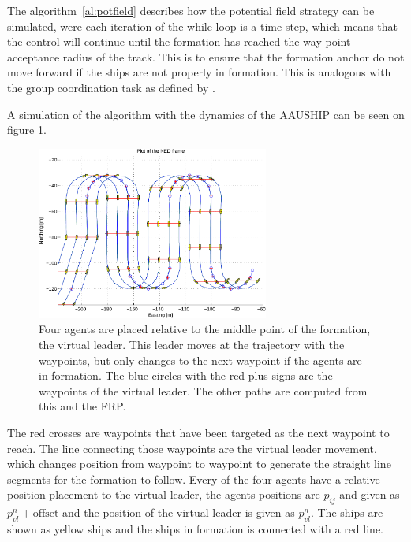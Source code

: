 \documentclass[a4paper,conference]{IEEEtran}
\newcommand{\colwidth}{3in}
\begin{document}
The algorithm~\vref{al:potfield} describes how the potential field
strategy can be simulated, were each iteration of the while loop is a
time step, which means that the control will continue until the
formation has reached the way point acceptance radius of the track.
This is to ensure that the formation anchor do not move forward if the
ships are not properly in formation. This is analogous with the group
coordination task as defined by \citep{thorvaldsen}.

A simulation of the algorithm with the dynamics of the AAUSHIP can be seen on figure \ref{fig:potform}.
\begin{figure}[htbp]
  \centering
  \includegraphics[width=\colwidth]{fig/lawn-bar-formation}
  \caption{Four agents are placed relative to the middle point of the
	formation, the virtual leader. This leader moves at the trajectory
with the waypoints, but only changes to the next waypoint if the
agents are in formation. The blue circles with the red plus signs are
the waypoints of the virtual leader. The other paths are computed from
this and the FRP.}
  \label{fig:potform}
\end{figure}
The red crosses are waypoints that have been targeted as the next waypoint to reach. The line connecting those waypoints are the virtual leader movement, which changes position from waypoint to waypoint to generate the straight line segments for the formation to follow. Every of the four agents have a relative position placement to the virtual leader, the agents positions are $p_{ij}$ and given as $p^n_{vl} + \text{offset}$ and the position of the virtual leader is given as $p^n_{vl}$. The ships are shown as yellow ships and the ships in formation is connected with a red line.
\end{document}
